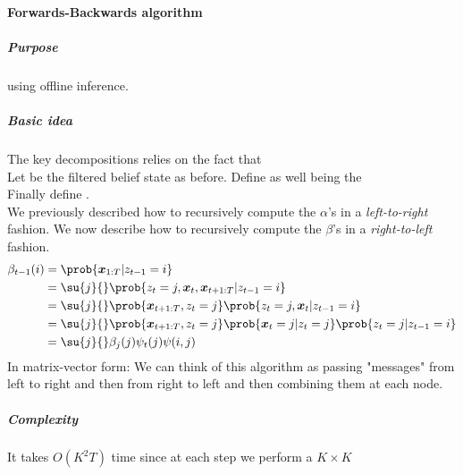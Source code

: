 \paragraph{Forwards-Backwards algorithm}
\subparagraph{Purpose}
 using offline inference.
\subparagraph{Basic idea}
The key decompositions relies on the fact that \\
Let  be the filtered belief state as before.
Define as well  being the \\
Finally define .\\
We previously described how to recursively compute the $\alpha$'s in a \emph{left-to-right} fashion.
We now describe how to recursively compute the $\beta$'s in a \emph{right-to-left} fashion.
\begin{align*}
    \beta_{t-1}(i) &= \prob{\bm{x}_{1:T}|z_{t-1}=i}\\
                   &= \su{j}{}\prob{z_{t}=j,\bm{x}_{t},\bm{x}_{t+1:T}|z_{t-1}=i}\\
                   &= \su{j}{}\prob{\bm{x}_{t+1:T},z_{t}=j}\prob{z_{t}=j,\bm{x}_{t}|z_{t-1}=i}\\
                   &= \su{j}{}\prob{\bm{x}_{t+1:T},z_{t}=j}\prob{\bm{x}_{t}=j|z_{t}=j}\prob{z_{t}=j|
                   z_{t-1}=i}\\
                   &= \su{j}{}\beta_{j}(j)\psi_{t}(j)\psi(i,j)
\end{align*}
In matrix-vector form: 
We can think of this algorithm as passing "messages" from left to right and then from right to
left and then combining them at each node.
\subparagraph{Complexity}
It takes $O(K^{2}T)$ time since at each step we perform a $K\times K$

